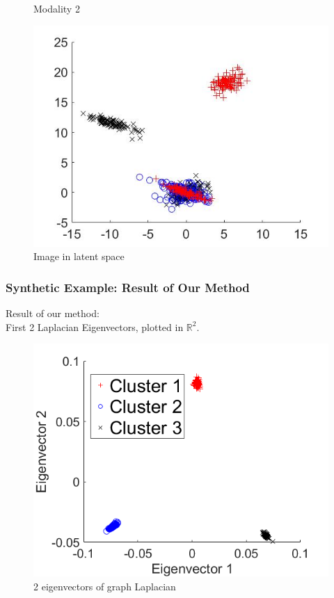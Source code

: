 \documentclass{beamer}
\begin{document}
\begin{frame}
\begin{figure}[ht]
\begin{minipage}[b]{0.32\linewidth}
      \caption{Modality 2}
    \end{minipage}
    \begin{minipage}[b]{0.32\linewidth}
      \centering
      \includegraphics[width=\textwidth]{./Images/Synthetic/clustersLatent.jpg}
      \caption{Image in latent space}
    \end{minipage}
    \label{fig:SynthData}
  \end{figure}
\end{frame}


\begin{frame}
  \frametitle{Synthetic Example: Result of Our Method}
  Result of our method:\\
  First 2 Laplacian Eigenvectors, plotted in $\mathbb{R}^2$.
  \begin{figure}
    \centering
    \includegraphics[width=0.5\linewidth]{./Images/Synthetic/clustersGraph.png}
    \caption{2 eigenvectors of graph Laplacian}
  \end{figure}
\end{frame}
\end{document}
